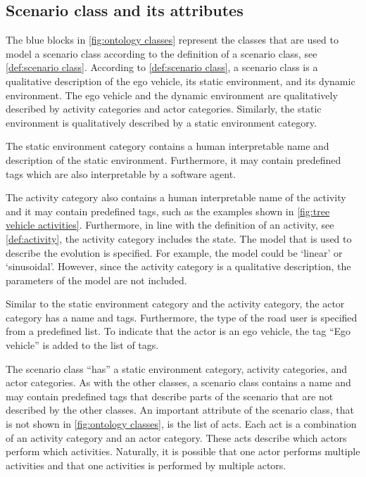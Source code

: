 \subsection{Scenario class and its attributes}
\label{sec:domain scenario class}

The blue blocks in \cref{fig:ontology classes} represent the classes that are used to model a scenario class according to the definition of a scenario class, see \cref{def:scenario class}. According to \cref{def:scenario class}, a scenario class is a qualitative description of the ego vehicle, its static environment, and its dynamic environment. The ego vehicle and the dynamic environment are qualitatively described by activity categories and actor categories. Similarly, the static environment is qualitatively described by a static environment category. 

The static environment category contains a human interpretable name and description of the static environment. Furthermore, it may contain predefined tags which are also interpretable by a software agent. 

The activity category also contains a human interpretable name of the activity and it may contain predefined tags, such as the examples shown in \cref{fig:tree vehicle activities}. Furthermore, in line with the definition of an activity, see \cref{def:activity}, the activity category includes the state.  The model that is used to describe the evolution is specified. For example, the model could be `linear' or `sinusoidal'. However, since the activity category is a qualitative description, the parameters of the model are not included.

Similar to the static environment category and the activity category, the actor category has a name and tags. Furthermore, the type of the road user is specified from a predefined list. To indicate that the actor is an ego vehicle, the tag ``Ego vehicle'' is added to the list of tags.

The scenario class ``has'' a static environment category, activity categories, and actor categories. As with the other classes, a scenario class contains a name and may contain predefined tags that describe parts of the scenario that are not described by the other classes. An important attribute of the scenario class, that is not shown in \cref{fig:ontology classes}, is the list of acts. Each act is a combination of an activity category and an actor category. These acts describe which actors perform which activities. Naturally, it is possible that one actor performs multiple activities and that one activities is performed by multiple actors.


